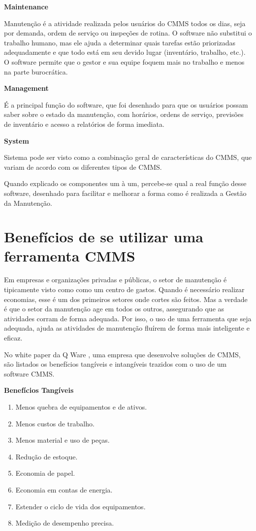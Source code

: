 \textbf{Maintenance}

Manutenção é a atividade realizada pelos usuários do CMMS todos os dias, seja por demanda, ordem de serviço ou inspeções de rotina. O software não substitui o trabalho humano, mas ele ajuda a determinar quais tarefas estão priorizadas adequadamente e que todo está em seu devido lugar (inventário, trabalho, etc.). O software permite que o gestor e sua equipe foquem mais no trabalho e menos na parte burocrática. 

\textbf{Management}

É a principal função do software, que foi desenhado para que os usuários possam saber sobre o estado da manutenção, com horários, ordens de serviço, previsões de inventário e acesso a relatórios de forma imediata. 

\textbf{System}

Sistema pode ser visto como a combinação geral de características do CMMS, que variam de acordo com os diferentes tipos de CMMS.

Quando explicado os componentes um à um, percebe-se qual a real função desse software, desenhado para facilitar e melhorar a forma como é realizada a Gestão da Manutenção. 

\section{Benefícios de se utilizar uma ferramenta CMMS}

Em empresas e organizações privadas e públicas, o setor de manutenção é tipicamente visto como como um centro de gastos. Quando é necessário realizar economias, esse é um dos primeiros setores onde cortes são feitos. Mas a verdade é que o setor da manutenção age em todos os outros, assegurando que as atividades corram de forma adequada. Por isso, o uso de uma ferramenta que seja adequada, ajuda as atividades de manutenção fluírem de forma mais inteligente e eficaz.

No white paper da Q Ware \cite{qware}, uma empresa que desenvolve soluções de CMMS, são listados os benefícios tangíveis e intangíveis trazidos com o uso de um software CMMS.

\textbf{Benefícios Tangíveis}

\begin{enumerate}
	\item Menos quebra de equipamentos e de ativos.
	\item Menos custos de trabalho.
	\item Menos material e uso de peças.
	\item Redução de estoque.
	\item Economia de papel.
	\item Economia em contas de energia.
	\item Estender o ciclo de vida dos equipamentos.
	\item Medição de desempenho precisa.
\end{enumerate}

